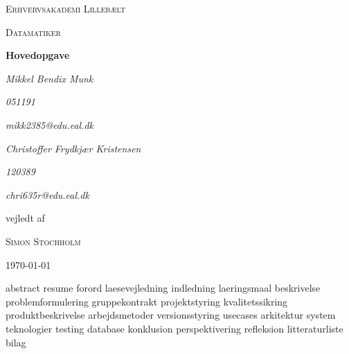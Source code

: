 \documentclass[a4paper, 11pt, danish]{report}
\begin{document}
\begin{titlepage}
    \centering
    {\scshape\LARGE Erhvervsakademi Lillebælt \par}
    \vspace{1cm}
    {\scshape\Large Datamatiker\par}
    \vspace{1.5cm}
    {\huge\bfseries Hovedopgave\par}
    \vspace{2cm}
    {\Large\itshape Mikkel Bendix Munk\par}
    {\small\itshape 051191\par}
    {\small\itshape mikk2385@edu.eal.dk\par}
    {\Large\itshape Christoffer Frydkjær Kristensen\par}
    {\small\itshape 120389\par}
    {\small\itshape chri635r@edu.eal.dk\par}
    \vfill
    vejledt af\par
    \textsc{Simon Stochholm}

    \vfill

    {\large \today\par}
\end{titlepage}
\tableofcontents{}
\newpage
{abstract}
{resume}
{forord}
{laesevejledning}
{indledning}
{laeringsmaal}
{beskrivelse}
{problemformulering}
{gruppekontrakt}
{projektstyring}
{kvalitetssikring}
{produktbeskrivelse}
{arbejdsmetoder}
{versionsstyring}
{usecases}
{arkitektur}
{system}
{teknologier}
{testing}
{database}
{konklusion}
{perspektivering}
{refleksion}
{litteraturliste}
{bilag}
\end{document}
